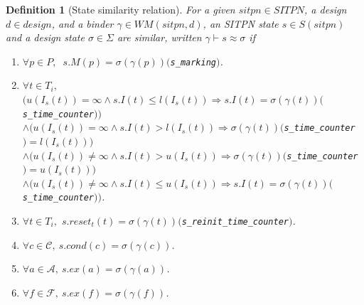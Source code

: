 \documentclass[pdflatex,sn-mathphys]{sn-jnl}%
\theoremstyle{thmstyleone}%
\theoremstyle{thmstyletwo}%
\theoremstyle{thmstylethree}%
\newtheorem{definition}{Definition}%
\begin{document}
\begin{definition}[State similarity relation]
  \label{def:state-sim}
  For a given $sitpn\in{}SITPN$, a \hvhdl{} design $d\in{}design$, and
  a binder $\gamma\in{}WM(sitpn,d)$, an SITPN state $s\in{}S(sitpn)$
  and a design state $\sigma\in\Sigma$ are similar, written
  $\gamma\vdash{}s\approx\sigma$ if
  \begin{enumerate}
  \item\label{item:sim-mark} $\forall{}p\in{}P,$
    $~s.M(p)=\sigma(\gamma(p))($\texttt{s\_marking}$)$.
  \item\label{item:sim-tc}
    $\forall{}t\in{}T_i,$\\
    $\big(u(I_s(t))=\infty\land{}s.I(t)\le{}l(I_s(t))\Rightarrow{}s.I(t)=\sigma(\gamma(t))($\texttt{s\_time\_counter}$)\big)$\\
    $\land\big(u(I_s(t))=\infty\land{}s.I(t)>{}l(I_s(t))\Rightarrow{}\sigma(\gamma(t))($\texttt{s\_time\_counter}$)=l(I_s(t))\big)$\\
    $\land\big(u(I_s(t))\neq\infty\land{}s.I(t)>{}u(I_s(t))\Rightarrow{}\sigma(\gamma(t))($\texttt{s\_time\_counter}$)=u(I_s(t))\big)$\\
    $\land\big(u(I_s(t))\neq\infty\land{}s.I(t)\le{}u(I_s(t))\Rightarrow{}s.I(t)=\sigma(\gamma(t))($\texttt{s\_time\_counter}$)\big)$.
  \item\label{item:sim-reset} $\forall{}t\in{}T_i,$
    $s.reset_t(t)=\sigma(\gamma(t))($\texttt{s\_reinit\_time\_counter}$)$.
  \item\label{item:sim-cond}
    $\forall{}c\in\mathcal{C},~s.cond(c)=\sigma(\gamma(c))$.
  \item\label{item:sim-act}
    $\forall{}a\in\mathcal{A},~s.ex(a)=\sigma(\gamma(a))$.
  \item\label{item:sim-fun}
    $\forall{}f\in\mathcal{F},~s.ex(f)=\sigma(\gamma(f))$.
  \end{enumerate}
\end{definition}
\end{document}
